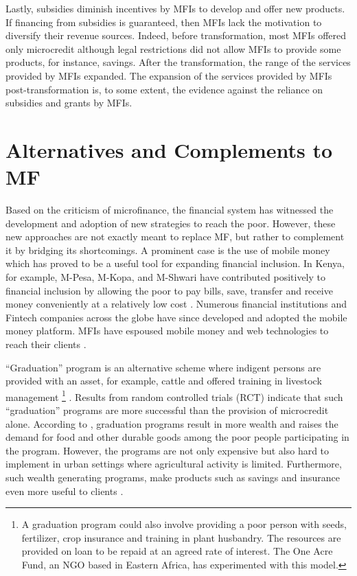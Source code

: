 \documentclass[a4paper, nobind]{templates/ociamthesis}
\begin{document}
Lastly, subsidies diminish incentives by MFIs to develop and offer new products. If financing from subsidies is guaranteed, then MFIs lack the motivation to diversify their revenue sources. Indeed, before transformation, most MFIs offered only microcredit \autocite{cozarenco2016type} although legal restrictions did not allow MFIs to provide some products, for instance, savings. After the transformation, the range of the services provided by MFIs expanded. The expansion of the services provided by MFIs post-transformation is, to some extent, the evidence against the reliance on subsidies and grants by MFIs.

\hypertarget{alternatives-and-complements-to-mf}{%
\section{Alternatives and Complements to MF}\label{alternatives-and-complements-to-mf}}

\noindent Based on the criticism of microfinance, the financial system has witnessed the development and adoption of new strategies to reach the poor. However, these new approaches are not exactly meant to replace MF, but rather to complement it by bridging its shortcomings. A prominent case is the use of mobile money which has proved to be a useful tool for expanding financial inclusion. In Kenya, for example, M-Pesa, M-Kopa, and M-Shwari have contributed positively to financial inclusion by allowing the poor to pay bills, save, transfer and receive money conveniently at a relatively low cost \autocite{klapper2015role,ndungumorales2017}. Numerous financial institutions and Fintech companies across the globe have since developed and adopted the mobile money platform. MFIs have espoused mobile money and web technologies to reach their clients \autocite{fd2017,ouma2017mobile}.

``Graduation'' program is an alternative scheme where indigent persons are provided with an asset, for example, cattle and offered training in livestock management \footnote{A graduation program could also involve providing a poor person with seeds, fertilizer, crop insurance and training in plant husbandry. The resources are provided on loan to be repaid at an agreed rate of interest. The One Acre Fund, an NGO based in Eastern Africa, has experimented with this model.} . Results from random controlled trials (RCT) indicate that such ``graduation'' programs are more successful than the provision of microcredit alone. According to \textcite{poverty2017here}, graduation programs result in more wealth and raises the demand for food and other durable goods among the poor people participating in the program. However, the programs are not only expensive but also hard to implement in urban settings where agricultural activity is limited. Furthermore, such wealth generating programs, make products such as savings and insurance even more useful to clients \autocite{cozarenco2016type}.
\end{document}
